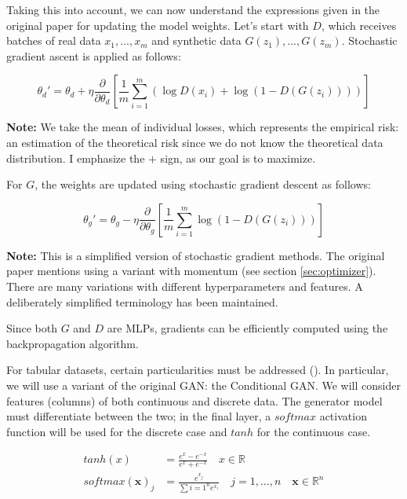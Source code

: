 Taking this into account, we can now understand the expressions given in the original paper \cite{goodfellow2014} for updating the model weights. Let's start with $D$, which receives batches of real data ${x_1,...,x_m}$ and synthetic data ${G(z_1),...,G(z_m)}$. Stochastic gradient ascent is applied as follows:

\begin{equation*}
\theta_{d}' = \theta_d + \eta \frac{\partial }{\partial \theta_d} \left[ \frac{1}{m} \sum_{i=1}^m \left( \log D(x_i) + \log (1 - D(G(z_i))) \right) \right]
\end{equation*}

\textbf{Note:} We take the mean of individual losses, which represents the empirical risk: an estimation of the theoretical risk since we do not know the theoretical data distribution. I emphasize the $+$ sign, as our goal is to maximize.

For $G$, the weights are updated using stochastic gradient descent as follows:

\begin{equation*}
\theta_{g}' = \theta_g - \eta \frac{\partial}{\partial \theta_g} \left[ \frac{1}{m} \sum_{i=1}^m \log(1 - D(G(z_i))) \right]
\end{equation*}

\textbf{Note:} This is a simplified version of stochastic gradient methods. The original paper mentions using a variant with momentum (see section \ref{sec:optimizer}). There are many variations with different hyperparameters and features. A deliberately simplified terminology has been maintained.

Since both $G$ and $D$ are MLPs, gradients can be efficiently computed using the backpropagation algorithm.

For tabular datasets, certain particularities must be addressed (\cite*{xu2019}). In particular, we will use a variant of the original GAN: the Conditional GAN. We will consider features (columns) of both continuous and discrete data. The generator model must differentiate between the two; in the final layer, a $softmax$ activation function will be used for the discrete case and $tanh$ for the continuous case.

\begin{align*}
tanh(x) &= \frac{e^x - e^{-x}}{e^x + e^{-x}} \quad x \in \mathbb{R} \\
softmax (\mathbf{x})_j &= \frac{e^{x_j}}{\sum{i=1}^n e^{x_i}} \quad j=1,...,n \quad \mathbf{x} \in \mathbb{R}^n
\end{align*}

